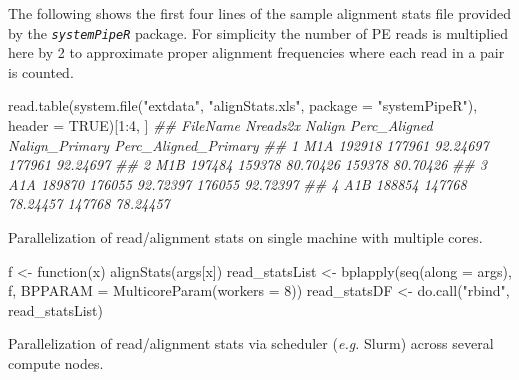 \documentclass[14pt,]{article}
\newcommand{\hlnum}[1]{\textcolor[rgb]{0.816,0.125,0.439}{#1}}%
\newcommand{\hlstr}[1]{\textcolor[rgb]{0.251,0.627,0.251}{#1}}%
\newcommand{\hlcom}[1]{\textcolor[rgb]{0.502,0.502,0.502}{\textit{#1}}}%
\newcommand{\hlopt}[1]{\textcolor[rgb]{0,0,0}{#1}}%
\newcommand{\hlstd}[1]{\textcolor[rgb]{0.251,0.251,0.251}{#1}}%
\newcommand{\hlkwc}[1]{\textcolor[rgb]{0.251,0.251,0.251}{#1}}%
\newcommand{\hlkwd}[1]{\textcolor[rgb]{0.878,0.439,0.125}{#1}}%
\newenvironment{Shaded}{\begin{myshaded}}{\end{myshaded}}
\newcommand{\KeywordTok}[1]{\hlkwd{#1}}
\newcommand{\DataTypeTok}[1]{\hlkwc{#1}}
\newcommand{\DecValTok}[1]{\hlnum{#1}}
\newcommand{\StringTok}[1]{\hlstr{#1}}
\newcommand{\CommentTok}[1]{\hlcom{#1}}
\newcommand{\OtherTok}[1]{{#1}}
\newcommand{\ControlFlowTok}[1]{\hlkwd{#1}}
\newcommand{\OperatorTok}[1]{\hlopt{#1}}
\newcommand{\NormalTok}[1]{\hlstd{#1}}
\begin{document}
The following shows the first four lines of the sample alignment stats file
provided by the \emph{\texttt{systemPipeR}} package. For simplicity the number of PE reads
is multiplied here by 2 to approximate proper alignment frequencies where each
read in a pair is counted.

\begin{Shaded}
\begin{Highlighting}[]
\KeywordTok{read.table}\NormalTok{(}\KeywordTok{system.file}\NormalTok{(}\StringTok{"extdata"}\NormalTok{, }\StringTok{"alignStats.xls"}\NormalTok{, }\DataTypeTok{package =} \StringTok{"systemPipeR"}\NormalTok{), }\DataTypeTok{header =} \OtherTok{TRUE}\NormalTok{)[}\DecValTok{1}\OperatorTok{:}\DecValTok{4}\NormalTok{, }
\NormalTok{    ]}
\CommentTok{##   FileName Nreads2x Nalign Perc_Aligned Nalign_Primary Perc_Aligned_Primary}
\CommentTok{## 1      M1A   192918 177961     92.24697         177961             92.24697}
\CommentTok{## 2      M1B   197484 159378     80.70426         159378             80.70426}
\CommentTok{## 3      A1A   189870 176055     92.72397         176055             92.72397}
\CommentTok{## 4      A1B   188854 147768     78.24457         147768             78.24457}
\end{Highlighting}
\end{Shaded}

Parallelization of read/alignment stats on single machine with multiple cores.

\begin{Shaded}
\begin{Highlighting}[]
\NormalTok{f <-}\StringTok{ }\ControlFlowTok{function}\NormalTok{(x) }\KeywordTok{alignStats}\NormalTok{(args[x])}
\NormalTok{read_statsList <-}\StringTok{ }\KeywordTok{bplapply}\NormalTok{(}\KeywordTok{seq}\NormalTok{(}\DataTypeTok{along =}\NormalTok{ args), f, }\DataTypeTok{BPPARAM =} \KeywordTok{MulticoreParam}\NormalTok{(}\DataTypeTok{workers =} \DecValTok{8}\NormalTok{))}
\NormalTok{read_statsDF <-}\StringTok{ }\KeywordTok{do.call}\NormalTok{(}\StringTok{"rbind"}\NormalTok{, read_statsList)}
\end{Highlighting}
\end{Shaded}

Parallelization of read/alignment stats via scheduler (\emph{e.g.} Slurm) across several compute nodes.
\end{document}
